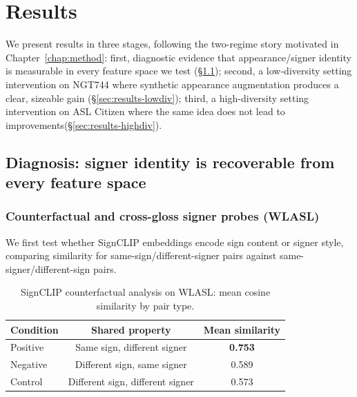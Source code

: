\chapter{Results}
\label{chap:results}

We present results in three stages, following the two-regime story
motivated in Chapter~\ref{chap:method}: first, diagnostic evidence that
appearance/signer identity is measurable in every feature space we test
(\S\ref{sec:results-diagnosis}); second, a low-diversity setting
intervention on NGT744 where synthetic appearance augmentation produces a
clear, sizeable gain (\S\ref{sec:results-lowdiv}); third, a high-diversity setting
intervention on ASL Citizen where the same idea does not lead to improvements(\S\ref{sec:results-highdiv}).

\section{Diagnosis: signer identity is recoverable from every feature space}
\label{sec:results-diagnosis}

\subsection{Counterfactual and cross-gloss signer probes (WLASL)}
We first test whether SignCLIP embeddings encode sign content or signer
style, comparing similarity for same-sign/different-signer pairs against
same-signer/different-sign pairs.

\begin{table}[t]
\centering\small
\begin{tabular}{lcc}
\hline
Condition & Shared property & Mean similarity \\
\hline
Positive & Same sign, different signer & \textbf{0.753} \\
Negative & Different sign, same signer & 0.589 \\
Control  & Different sign, different signer & 0.573 \\
\hline
\end{tabular}
\caption[SignCLIP counterfactual analysis on WLASL]{SignCLIP counterfactual analysis on WLASL: mean cosine similarity
by pair type.}
\label{tab:wlasl_counterfactual}
\end{table}

